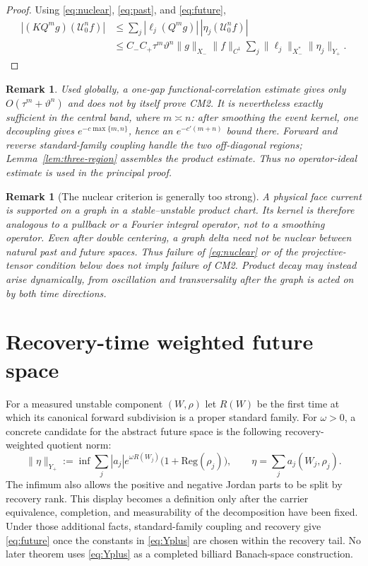\documentclass[11pt]{article}
\newtheorem{remark}[theorem]{Remark}
\newcommand{\cU}{\mathcal U}
\begin{document}
\begin{proof}
Using \eqref{eq:nuclear}, \eqref{eq:past}, and \eqref{eq:future},
\begin{align*}
 |(KQ^mg)(\cU_0^nf)|
 &\le\sum_j|\ell_j(Q^mg)|\,
              |\eta_j(\cU_0^nf)|\\
 &\le C_-C_+\tau^m\vartheta^n\|g\|_{X_-}\|f\|_{C^1}
       \sum_j\|\ell_j\|_{X_-^*}\|\eta_j\|_{Y_+}.
\end{align*}
\end{proof}

\begin{remark}
Used globally, a one-gap functional-correlation estimate gives only
$O(\tau^m+\vartheta^n)$ and does not by itself prove CM2.  It is nevertheless
exactly sufficient in the central band, where $m\asymp n$: after smoothing
the event kernel, one decoupling gives $e^{-c\max\{m,n\}}$, hence an
$e^{-c'(m+n)}$ bound there.  Forward and reverse standard-family coupling
handle the two off-diagonal regions; Lemma~\ref{lem:three-region} assembles
the product estimate.  Thus no operator-ideal estimate is used in the
principal proof.
\end{remark}

\begin{remark}[The nuclear criterion is generally too strong]
\label{rem:nuclear-too-strong}
A physical face current is supported on a graph in a stable--unstable product
chart.  Its kernel is therefore analogous to a pullback or a Fourier integral
operator, not to a smoothing operator.  Even after double centering, a graph
delta need not be nuclear between natural past and future spaces.  Thus failure
of \eqref{eq:nuclear} or of the projective-tensor condition below does
\emph{not} imply failure of CM2.  Product decay may instead arise dynamically,
from oscillation and transversality after the graph is acted on by both time
directions.
\end{remark}

\section{Recovery-time weighted future space}

For a measured unstable component $(W,\rho)$ let $R(W)$ be the first time at
which its canonical forward subdivision is a proper standard family.  For
$\omega>0$, a concrete candidate for the abstract future space is the
following recovery-weighted quotient norm:
\begin{equation}
\label{eq:Yplus}
 \|\eta\|_{Y_+}
 :=\inf\sum_j|a_j|e^{\omega R(W_j)}
       \bigl(1+\mathrm{Reg}(\rho_j)\bigr),
 \qquad
 \eta=\sum_ja_j(W_j,\rho_j).
\end{equation}
The infimum also allows the positive and negative Jordan parts to be split by
recovery rank.  This display becomes a definition only after the carrier
equivalence, completion, and measurability of the decomposition have been
fixed.  Under those additional facts, standard-family coupling and recovery
give \eqref{eq:future} once the constants in \eqref{eq:Yplus} are chosen
within the recovery tail.  No later theorem uses \eqref{eq:Yplus} as a
completed billiard Banach-space construction.
\end{document}
